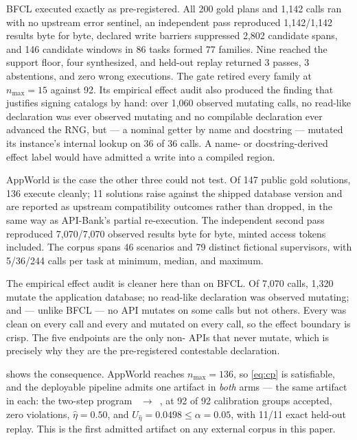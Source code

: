 BFCL executed exactly as pre-registered. All 200 gold plans and 1,142 calls ran with no
upstream error sentinel, an independent pass reproduced 1,142/1,142 results byte for byte,
declared write barriers suppressed 2,802 candidate spans, and 146 candidate windows in 86
tasks formed 77 families. Nine reached the support floor, four synthesized, and held-out
replay returned 3 passes, 3 abstentions, and zero wrong executions. The gate retired every
family at $n_{\max}=15$ against 92. Its empirical effect audit also produced the finding that
justifies signing catalogs by hand: over 1,060 observed mutating calls, no read-like
declaration was ever observed mutating and no compilable declaration ever advanced the RNG,
but  --- a nominal getter by name and docstring --- mutated
its instance's internal lookup on 36 of 36 calls. A name- or docstring-derived effect label
would have admitted a write into a compiled region.

AppWorld is the case the other three could not test. Of 147 public gold solutions, 136
execute cleanly; 11  solutions raise against the shipped database version and are
reported as upstream compatibility outcomes rather than dropped, in the same way as
API-Bank's partial re-execution. The independent second pass reproduced 7,070/7,070 observed
results byte for byte, minted access tokens included. The corpus spans 46 scenarios and 79
distinct fictional supervisors, with 5/36/244 calls per task at minimum, median, and maximum.

The empirical effect audit is cleaner here than on BFCL. Of 7,070 calls, 1,320 mutate the
application database; no read-like declaration was observed mutating; and --- unlike BFCL ---
no API mutates on some calls but not others. Every  was clean on every call and
every  and  mutated on every call, so the effect boundary is crisp.
The five  endpoints are the only non- APIs that never mutate, which is
precisely why they are the pre-registered contestable declaration.

 shows the consequence. AppWorld reaches $n_{\max}=136$, so
\eqref{eq:cp} is satisfiable, and the deployable pipeline admits one artifact in \emph{both}
arms --- the same artifact in each: the two-step program
~$\rightarrow$~, at 92
of 92 calibration groups accepted, zero violations, $\hat\eta=0.50$, and
$U_{\hat\eta}=0.0498\le\alpha=0.05$, with 11/11 exact held-out replay. This is the first
admitted artifact on any external corpus in this paper.


